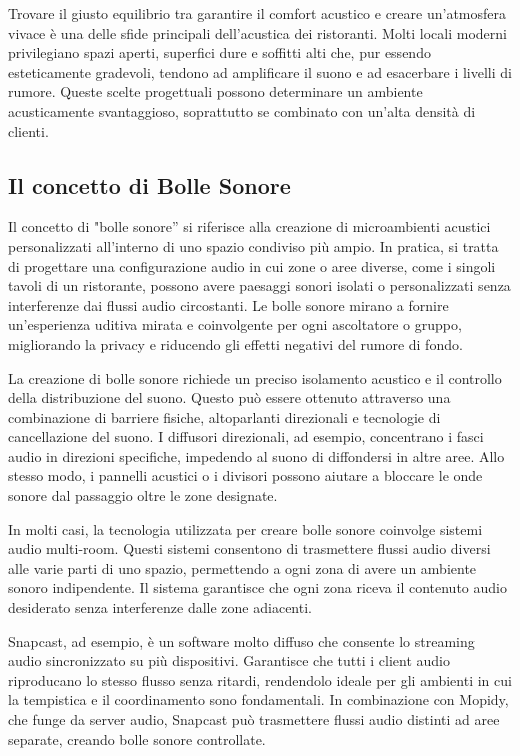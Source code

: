 Trovare il giusto equilibrio tra garantire il comfort acustico e creare un'atmosfera vivace è una delle sfide principali dell'acustica dei ristoranti. Molti locali moderni privilegiano spazi aperti, superfici dure e soffitti alti che, pur essendo esteticamente gradevoli, tendono ad amplificare il suono e ad esacerbare i livelli di rumore. Queste scelte progettuali possono determinare un ambiente acusticamente svantaggioso, soprattutto se combinato con un'alta densità di clienti. \cite{wiki:sound-restaurants}

\subsection{Il concetto di Bolle Sonore}
\noindent

Il concetto di "bolle sonore” si riferisce alla creazione di microambienti acustici personalizzati all'interno di uno spazio condiviso più ampio. In pratica, si tratta di progettare una configurazione audio in cui zone o aree diverse, come i singoli tavoli di un ristorante, possono avere paesaggi sonori isolati o personalizzati senza interferenze dai flussi audio circostanti. Le bolle sonore mirano a fornire un'esperienza uditiva mirata e coinvolgente per ogni ascoltatore o gruppo, migliorando la privacy e riducendo gli effetti negativi del rumore di fondo.

La creazione di bolle sonore richiede un preciso isolamento acustico e il controllo della distribuzione del suono. Questo può essere ottenuto attraverso una combinazione di barriere fisiche, altoparlanti direzionali e tecnologie di cancellazione del suono. I diffusori direzionali, ad esempio, concentrano i fasci audio in direzioni specifiche, impedendo al suono di diffondersi in altre aree. Allo stesso modo, i pannelli acustici o i divisori possono aiutare a bloccare le onde sonore dal passaggio oltre le zone designate.

In molti casi, la tecnologia utilizzata per creare bolle sonore coinvolge sistemi audio multi-room. Questi sistemi consentono di trasmettere flussi audio diversi alle varie parti di uno spazio, permettendo a ogni zona di avere un ambiente sonoro indipendente. Il sistema garantisce che ogni zona riceva il contenuto audio desiderato senza interferenze dalle zone adiacenti.

Snapcast, ad esempio, è un software molto diffuso che consente lo streaming audio sincronizzato su più dispositivi. Garantisce che tutti i client audio riproducano lo stesso flusso senza ritardi, rendendolo ideale per gli ambienti in cui la tempistica e il coordinamento sono fondamentali. In combinazione con Mopidy, che funge da server audio, Snapcast può trasmettere flussi audio distinti ad aree separate, creando bolle sonore controllate.

